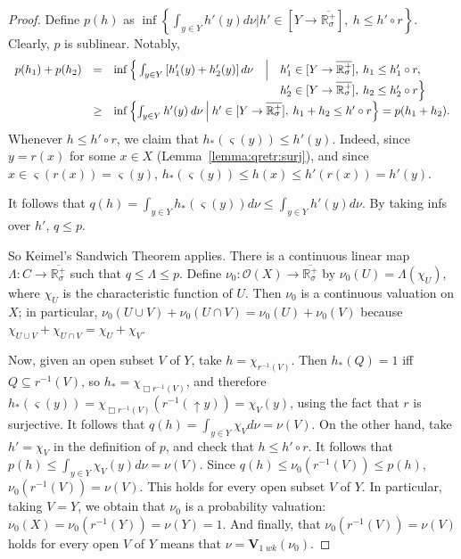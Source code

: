 \documentclass{LMCS}
\newcommand\Open{\mathcal O}
\newcommand\upc{\mathop{\uparrow}\nolimits}
\newcommand\qs{\varsigma}
\newcommand\Val{\mathbf V}
\newcommand{\real}{\mathbb{R}}
\newcommand{\creal}{\overline{\real^+_\sigma}}
\begin{document}
\begin{proof}
  Define $p (h)$ as $\inf \left\{\int_{y \in Y} h' (y) d\nu \mathbin{\Big|} h'
    \in [Y \to \creal],\: h \leq h' \circ r\right\}$.  Clearly, $p$ is
  sublinear.  Notably,
  \[
  \begin{array}{rclcl}
    p (h_1) + p (h_2) & = &
    \inf
    \Big\{\int_{y \in Y} \left[h'_1 (y) + h'_2 (y)\right] d\nu
    & \mathbin{\Big|}{} &
    h'_1 \in [Y \to \creal], \: h_1 \leq h'_1 \circ r, \\
    &&&&
    h'_2 \in [Y \to \creal], \: h_2 \leq h'_2 \circ r\Big\} \\
    & \geq &
    \multicolumn{3}{l}{
      \inf
      \left\{\int_{y \in Y} h' (y)\: d\nu \mathbin{\Big|}
        h' \in [Y \to \creal],\: h_1 + h_2 \leq h' \circ r
      \right\}
      = p (h_1 + h_2).
    }
  \end{array}
  \]
  Whenever $h \leq h' \circ r$, we claim that $h_* (\qs (y)) \leq h'
  (y)$.  Indeed, since $y = r (x)$ for some $x \in X$
  (Lemma~\ref{lemma:qretr:surj}), and since $x \in \qs (r (x)) = \qs
  (y)$, $h_* (\qs (y)) \leq h (x) \leq h' (r (x)) = h' (y)$.

  It follows that $q (h) = \int_{y \in Y} h_* (\qs (y)) d\nu \leq
  \int_{y \in Y} h' (y) d\nu$.  By taking infs over $h'$, $q \leq p$.

  So Keimel's Sandwich Theorem applies.  There is a continuous linear
  map $\Lambda : C \to \creal$ such that $q \leq \Lambda \leq p$.
  Define $\nu_0 : \Open (X) \to \creal$ by $\nu_0 (U) = \Lambda
  (\chi_U)$, where $\chi_U$ is the characteristic function of $U$.
  Then $\nu_0$ is a continuous valuation on $X$; in particular, $\nu_0
  (U \cup V) + \nu_0 (U \cap V) = \nu_0 (U) + \nu_0 (V)$ because
  $\chi_{U \cup V} + \chi_{U \cap V} = \chi_U + \chi_V$.

  Now, given an open subset $V$ of $Y$, take $h = \chi_{r^{-1} (V)}$.
  Then $h_* (Q) = 1$ iff $Q \subseteq r^{-1} (V)$, so $h_* =
  \chi_{\Box r^{-1} (V)}$, and therefore $h_* (\qs (y)) = \chi_{\Box
    r^{-1} (V)} (r^{-1} (\upc y)) = \chi_V (y)$, using the fact that
  $r$ is surjective.  It follows that $q (h) = \int_{y \in Y} \chi_V
  d\nu = \nu (V)$.  On the other hand, take $h' = \chi_V$ in the
  definition of $p$, and check that $h \leq h' \circ r$.  It follows
  that $p (h) \leq \int_{y \in Y} \chi_V (y) d\nu = \nu (V)$.  Since
  $q (h) \leq \nu_0 (r^{-1} (V)) \leq p (h)$, $\nu_0 (r^{-1} (V)) =
  \nu (V)$.  This holds for every open subset $V$ of $Y$.  In
  particular, taking $V = Y$, we obtain that $\nu_0$ is a probability
  valuation: $\nu_0 (X) = \nu_0 (r^{-1} (Y)) = \nu (Y) = 1$.  And
  finally, that $\nu_0 (r^{-1} (V)) = \nu (V)$ holds for every open
  $V$ of $Y$ means that $\nu = \Val_{1\;wk} (\nu_0)$.
\end{proof}
\end{document}
